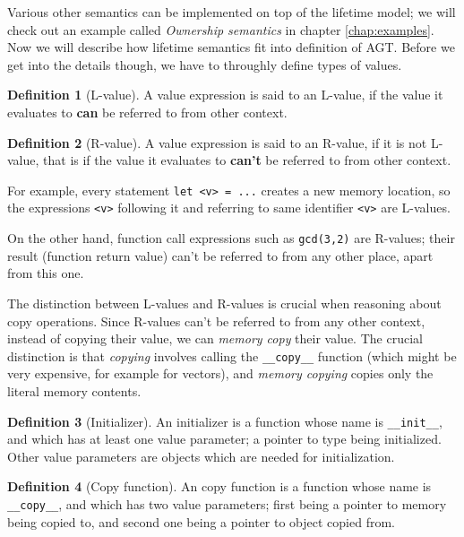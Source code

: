 \documentclass[times, utf8, diplomski]{fer}
\theoremstyle{definition}
\newtheorem{definition}{Definition}[]
\begin{document}
Various other semantics can be implemented on top of the lifetime model; we will check out an example called
\textit{Ownership semantics} in chapter \ref{chap:examples}. 
Now we will describe how lifetime semantics fit into
definition of AGT. Before we get into the details though, we have to throughly define types of values.

\begin{definition}[L-value]
A value expression is said to an L-value, 
if the value it evaluates to \textbf{can} be referred to from other context.
\end{definition}

\begin{definition}[R-value]
A value expression is said to an R-value, if it is not L-value, that is
if the value it evaluates to \textbf{can't} be referred to from other context.
\end{definition}

For example, every statement \texttt{let <v> = ...} creates a new memory location,
so the expressions \texttt{<v>} following it and referring to same identifier \texttt{<v>} are L-values.

On the other hand, function call expressions such as \texttt{gcd(3,2)} are R-values; their result
(function return value) can't be referred to from any other place, apart from this one.

The distinction between L-values and R-values is crucial when reasoning about copy operations.
Since R-values can't be referred to from any other context, instead of copying their value, 
we can \textit{memory copy} their value. The crucial distinction is that \textit{copying}
involves calling the \texttt{\_\_copy\_\_} function (which might be very expensive, for example for vectors),
and \textit{memory copying} copies only the literal memory contents.

\begin{definition}[Initializer]
An initializer is a function whose name is \texttt{\_\_init\_\_}, and which has at least one value parameter;
a pointer to type being initialized. Other value parameters are objects which are needed for initialization.
\end{definition}

\begin{definition}[Copy function]
An copy function is a function whose name is \texttt{\_\_copy\_\_}, and which has two value parameters;
first being a pointer to memory being copied to, and second one being a pointer to object copied from.
\end{definition}
\end{document}
